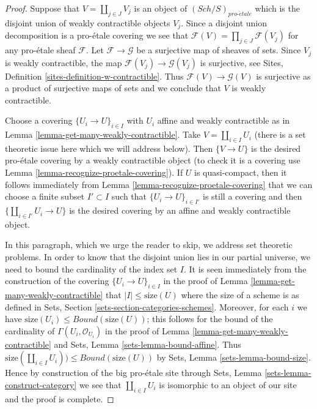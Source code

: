 \documentclass{stacks-project}
\theoremstyle{plain}
\theoremstyle{definition}
\theoremstyle{remark}
\numberwithin{equation}{subsection}
\def\Sch{\mathit{Sch}}
\def\proetale{{pro\text{-}\acute{e}tale}}
\begin{document}
\begin{proof}
Suppose that $V = \coprod_{j \in J} V_j$ is an object of $(\Sch/S)_\proetale$
which is the disjoint union of weakly contractible objects $V_j$.
Since a disjoint union decomposition is a pro-\'etale covering we
see that $\mathcal{F}(V) = \prod_{j \in J} \mathcal{F}(V_j)$ for any
pro-\'etale sheaf $\mathcal{F}$. Let $\mathcal{F} \to \mathcal{G}$
be a surjective map of sheaves of sets. Since $V_j$ is weakly contractible,
the map $\mathcal{F}(V_j) \to \mathcal{G}(V_j)$ is surjective, see
Sites, Definition \ref{sites-definition-w-contractible}.
Thus $\mathcal{F}(V) \to \mathcal{G}(V)$ is surjective as a product
of surjective maps of sets and we conclude that $V$ is weakly contractible.

\medskip\noindent
Choose a covering $\{U_i \to U\}_{i \in I}$ with $U_i$ affine and
weakly contractible as in Lemma \ref{lemma-get-many-weakly-contractible}.
Take $V = \coprod_{i \in I} U_i$ (there is a set theoretic issue here
which we will address below). Then $\{V \to U\}$ is the desired
pro-\'etale covering by a weakly contractible object
(to check it is a covering use
Lemma \ref{lemma-recognize-proetale-covering}).
If $U$ is quasi-compact, then it follows immediately from
Lemma \ref{lemma-recognize-proetale-covering}
that we can choose a finite subset $I' \subset I$ such that
$\{U_i \to U\}_{i \in I'}$ is still a covering
and then $\{\coprod_{i \in I'} U_i \to U\}$ is the desired covering
by an affine and weakly contractible object.

\medskip\noindent
In this paragraph, which we urge the reader to skip, we address
set theoretic problems. In order to know that the disjoint union
lies in our partial universe, we need to bound the cardinality of
the index set $I$. It is seen immediately from the construction of
the covering $\{U_i \to U\}_{i \in I}$ in the proof of
Lemma \ref{lemma-get-many-weakly-contractible}
that $|I| \leq \text{size}(U)$ where the size of a scheme is as
defined in Sets, Section \ref{sets-section-categories-schemes}.
Moreover, for each $i$ we have
$\text{size}(U_i) \leq Bound(\text{size}(U))$;
this follows for the bound of the cardinality of
$\Gamma(U_i, \mathcal{O}_{U_i})$ in
the proof of Lemma \ref{lemma-get-many-weakly-contractible}
and Sets, Lemma \ref{sets-lemma-bound-affine}.
Thus $\text{size}(\coprod_{i \in I} U_i)) \leq Bound(\text{size}(U))$
by Sets, Lemma \ref{sets-lemma-bound-size}.
Hence by construction of the big pro-\'etale site through
Sets, Lemma \ref{sets-lemma-construct-category}
we see that $\coprod_{i \in I} U_i$ is isomorphic to an object
of our site and the proof is complete.
\end{proof}
\end{document}
